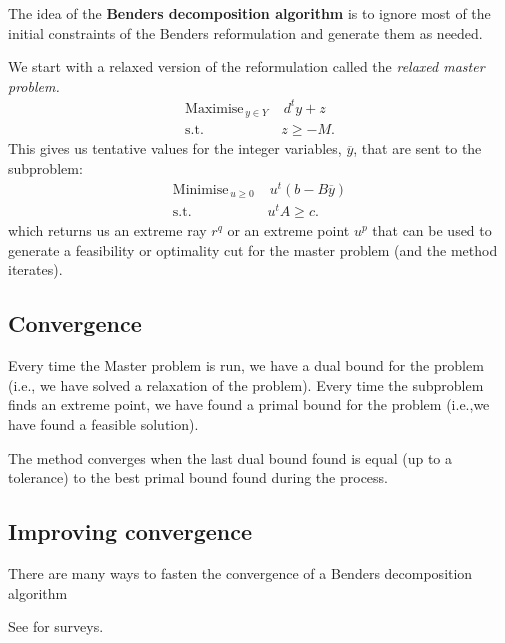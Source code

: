 The idea of the \textbf{Benders decomposition algorithm} is to ignore most of the initial constraints of the Benders reformulation and generate them as needed. 

We start with a relaxed version of the reformulation called the \emph{relaxed master problem.}
\begin{align*}
\textrm{Maximise}_{\, y \in Y \,}  & \,  d^ty + z \\
\textrm{s.t.} \quad & z \geq -M.
\end{align*}
\vspace{-.2cm}
This gives us tentative values for the integer variables, $\overline{y}$, that are sent to the subproblem:
\begin{align*}
\textrm{Minimise}_{\, u \geq 0 \,}  & \,  u^t(b-B\overline{y}) \\
\textrm{s.t.} \quad & u^tA \geq c.
\end{align*}
which returns us an extreme ray $r^q$ or an extreme point $u^p$ that can be used to generate a feasibility or optimality cut for the master problem (and the method iterates). 

\vfill

\subsection*{Convergence}

Every time the Master problem is run, we have a dual bound for the problem (i.e., we have solved a relaxation of the problem). Every time the subproblem finds an extreme point, we have found a primal bound for the problem (i.e.,we have found a feasible solution). 

The method converges when the last dual bound found is equal (up to a tolerance) to the best primal bound found during the process. 

\vfill


\subsection*{Improving convergence}

There are many ways to fasten the convergence of a Benders decomposition algorithm \cite{mcdaniel77modified,magnanti81accelerating,papadakos08practical,costa12accelerating,crainic21partial} 

See \cite{costa05survey,rahmaniani17benders} for surveys.


\newpage

